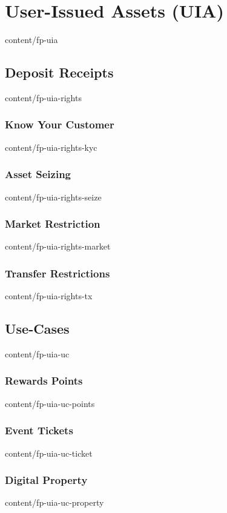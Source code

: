 \documentclass{btswhitepaper}
\begin{document}
\section        { User-Issued Assets (UIA)                         }  { content/fp-uia                 } 
\subsection     { Deposit Receipts                                 }  { content/fp-uia-rights          } 
\subsubsection  { Know Your Customer                               }  { content/fp-uia-rights-kyc      } 
\subsubsection  { Asset Seizing                                    }  { content/fp-uia-rights-seize    } 
\subsubsection  { Market Restriction                               }  { content/fp-uia-rights-market   } 
\subsubsection  { Transfer Restrictions                            }  { content/fp-uia-rights-tx       } 
\subsection     { Use-Cases                                        }  { content/fp-uia-uc              } 
\subsubsection  { Rewards Points                                   }  { content/fp-uia-uc-points       } 
\subsubsection  { Event Tickets                                    }  { content/fp-uia-uc-ticket       } 
\subsubsection  { Digital Property                                 }  { content/fp-uia-uc-property     } 
\end{document}
